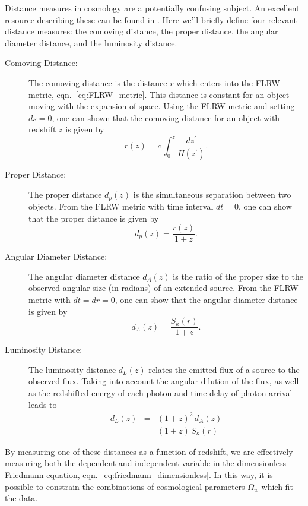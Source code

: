 Distance measures in cosmology are a potentially confusing subject.  An
excellent resource describing these can be found in \citet{hogg1999distance}.
Here we'll briefly define four relevant distance measures: the comoving
distance, the proper distance, the angular diameter distance, and the
luminosity distance.

\begin{description}
  \item[Comoving Distance:] The comoving distance is the distance $r$ which
    enters into the FLRW metric, eqn.~\ref{eq:FLRW_metric}.  This distance is
    constant for an object moving with the expansion of space.  Using the
    FLRW metric and setting $ds=0$, one can shown that the comoving
    distance for an object with redshift $z$ is given by
    \begin{equation}
      \label{eq:comoving_distance}
      r(z) = c\,\int_0^z \frac{dz^\prime}{H(z^\prime)}.
    \end{equation}
  \item[Proper Distance:] The proper distance $d_p(z)$ is the simultaneous
    separation between two objects.  From the FLRW metric with time interval
    $dt=0$, one can show that the proper distance is given by
    \begin{equation}
      \label{eq:proper_distance}
      d_p(z) = \frac{r(z)}{1 + z}.
    \end{equation}
  \item[Angular Diameter Distance:] The angular diameter distance $d_A(z)$
    is the
    ratio of the proper size to the observed angular size (in radians) of
    an extended source.  From the FLRW metric with $dt = dr = 0$, one
    can show that the angular diameter distance is given by
    \begin{equation}
      \label{eq:angular_diameter_distance}
      d_A(z) = \frac{S_\kappa(r)}{1 + z}.
    \end{equation}
  \item[Luminosity Distance:] The luminosity distance $d_L(z)$ relates the
    emitted flux of a source to the observed flux.  Taking into account
    the angular dilution of the flux, as well as the redshifted energy of
    each photon and time-delay of photon arrival leads to
    \begin{eqnarray}
      \label{eq:luminosity_distance}
      d_L(z) &=& (1 + z)^2\,d_A(z) \nonumber\\
      &=& (1 + z)\,S_\kappa(r)
    \end{eqnarray}
\end{description}
By measuring one of these distances as a function of redshift, we are
effectively measuring both the dependent and independent variable
in the dimensionless Friedmann equation, eqn.~\ref{eq:friedmann_dimensionless}.
In this way, it is possible to constrain the combinations of cosmological
parameters $\Omega_w$ which fit the data.

